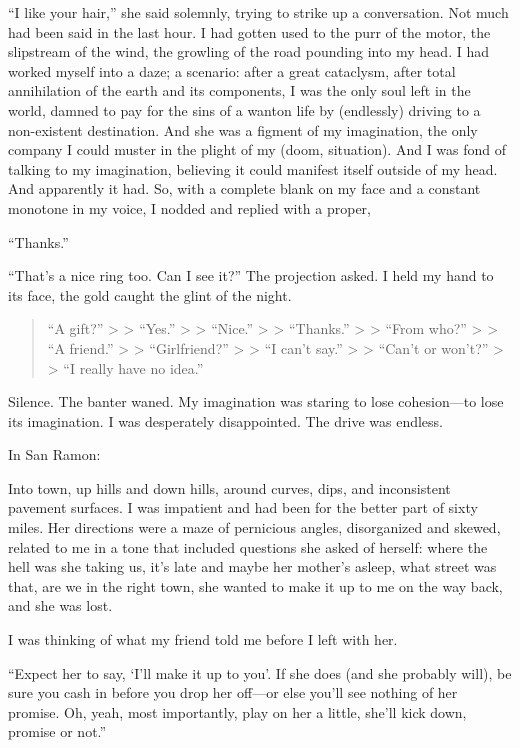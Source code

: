 \documentclass[
]{article}
\begin{document}
``I like your hair,'' she said solemnly, trying to strike up a
conversation. Not much had been said in the last hour. I had gotten used
to the purr of the motor, the slipstream of the wind, the growling of
the road pounding into my head. I had worked myself into a daze; a
scenario: after a great cataclysm, after total annihilation of the earth
and its components, I was the only soul left in the world, damned to pay
for the sins of a wanton life by (endlessly) driving to a non-existent
destination. And she was a figment of my imagination, the only company I
could muster in the plight of my (doom, situation). And I was fond of
talking to my imagination, believing it could manifest itself outside of
my head. And apparently it had. So, with a complete blank on my face and
a constant monotone in my voice, I nodded and replied with a proper,

``Thanks.''

``That's a nice ring too. Can I see it?'' The projection asked. I held
my hand to its face, the gold caught the glint of the night.

\begin{quote}
``A gift?'' \textgreater{} \textgreater{} ``Yes.'' \textgreater{}
\textgreater{} ``Nice.'' \textgreater{} \textgreater{} ``Thanks.''
\textgreater{} \textgreater{} ``From who?'' \textgreater{}
\textgreater{} ``A friend.'' \textgreater{} \textgreater{}
``Girlfriend?'' \textgreater{} \textgreater{} ``I can't say.''
\textgreater{} \textgreater{} ``Can't or won't?'' \textgreater{}
\textgreater{} ``I really have no idea.''
\end{quote}

Silence. The banter waned. My imagination was staring to lose
cohesion---to lose its imagination. I was desperately disappointed. The
drive was endless.

In San Ramon:

Into town, up hills and down hills, around curves, dips, and
inconsistent pavement surfaces. I was impatient and had been for the
better part of sixty miles. Her directions were a maze of pernicious
angles, disorganized and skewed, related to me in a tone that included
questions she asked of herself: where the hell was she taking us, it's
late and maybe her mother's asleep, what street was that, are we in the
right town, she wanted to make it up to me on the way back, and she was
lost.

I was thinking of what my friend told me before I left with her.

``Expect her to say, `I'll make it up to you'. If she does (and she
probably will), be sure you cash in before you drop her off---or else
you'll see nothing of her promise. Oh, yeah, most importantly, play on
her a little, she'll kick down, promise or not.''
\end{document}
